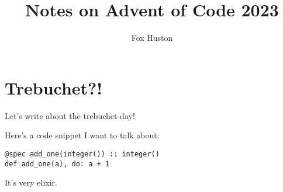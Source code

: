 \documentclass{article}
\title{Notes on Advent of Code 2023}
\author{Fox Huston}
\begin{document}
\maketitle

\section{Trebuchet?!}
Let's write about the trebuchet-day!

Here's a code snippet I want to talk about:

\begin{verbatim}
@spec add_one(integer()) :: integer()
def add_one(a), do: a + 1
\end{verbatim}
It's very elixir.
\end{document}
